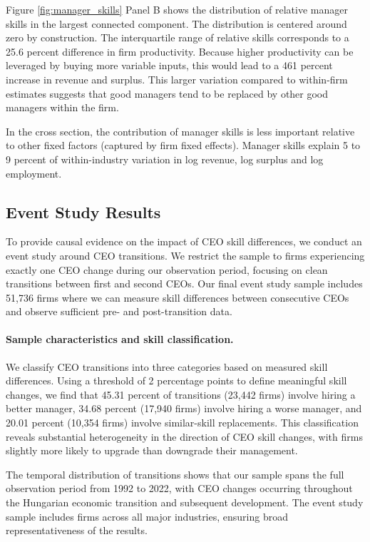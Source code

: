 \documentclass[11pt,a4paper]{article}
\begin{document}
Figure \ref{fig:manager_skills} Panel B shows the distribution of relative manager skills in the largest connected component. The distribution is centered around zero by construction. The interquartile range of relative skills corresponds to a 25.6 percent difference in firm productivity. Because higher productivity can be leveraged by buying more variable inputs, this would lead to a 461 percent increase in revenue and surplus. This larger variation compared to within-firm estimates suggests that good managers tend to be replaced by other good managers within the firm. 

In the cross section, the contribution of manager skills is less important relative to other fixed factors (captured by firm fixed effects). Manager skills explain 5 to 9 percent of within-industry variation in log revenue, log surplus and log employment.

\subsection{Event Study Results}

To provide causal evidence on the impact of CEO skill differences, we conduct an event study around CEO transitions. We restrict the sample to firms experiencing exactly one CEO change during our observation period, focusing on clean transitions between first and second CEOs. Our final event study sample includes 51,736 firms where we can measure skill differences between consecutive CEOs and observe sufficient pre- and post-transition data.

\paragraph{Sample characteristics and skill classification.} We classify CEO transitions into three categories based on measured skill differences. Using a threshold of 2 percentage points to define meaningful skill changes, we find that 45.31 percent of transitions (23,442 firms) involve hiring a better manager, 34.68 percent (17,940 firms) involve hiring a worse manager, and 20.01 percent (10,354 firms) involve similar-skill replacements. This classification reveals substantial heterogeneity in the direction of CEO skill changes, with firms slightly more likely to upgrade than downgrade their management.

The temporal distribution of transitions shows that our sample spans the full observation period from 1992 to 2022, with CEO changes occurring throughout the Hungarian economic transition and subsequent development. The event study sample includes firms across all major industries, ensuring broad representativeness of the results.
\end{document}
